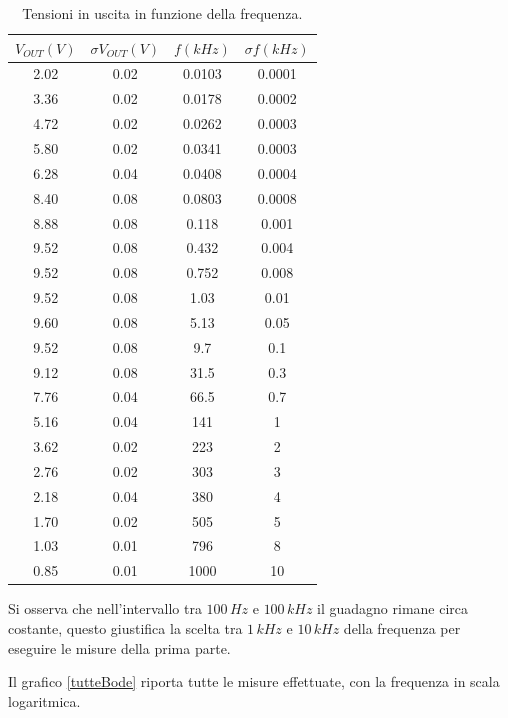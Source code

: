 \documentclass[10pt,a4paper]{article}
\begin{document}
\begin{table}[!htb]\centering
\begin{tabular}{|c|c|c|c|}
\hline
$V_{OUT} (V)$ & $\sigma V_{OUT} (V)$ & $f(kHz)$ & $\sigma f (kHz)$\\
\hline
2.02 & 0.02 & 0.0103 & 0.0001\\
3.36 & 0.02 & 0.0178 & 0.0002\\
4.72 & 0.02 & 0.0262 & 0.0003\\
5.80 & 0.02 & 0.0341 & 0.0003\\
6.28 & 0.04 & 0.0408 & 0.0004\\
8.40 & 0.08 & 0.0803 & 0.0008\\
8.88 & 0.08 & 0.118 & 0.001\\
9.52 & 0.08 & 0.432 & 0.004\\
9.52 & 0.08 & 0.752 & 0.008\\
9.52 & 0.08 & 1.03 & 0.01\\
9.60 & 0.08 & 5.13 & 0.05\\
9.52 & 0.08 & 9.7 & 0.1\\
9.12 & 0.08 & 31.5 & 0.3\\
7.76 & 0.04 & 66.5 & 0.7\\
5.16 & 0.04 & 141 & 1\\
3.62 & 0.02 & 223 & 2\\
2.76 & 0.02 & 303 & 3\\
2.18 & 0.04 & 380 & 4\\
1.70 & 0.02 & 505 & 5\\
1.03 & 0.01 & 796 & 8\\
0.85 & 0.01 & 1000 & 10\\
\hline
\end{tabular}
\caption{Tensioni in uscita in funzione della frequenza.}
\label{bode}
\end{table}

Si osserva che nell'intervallo tra $100\,Hz$ e $100\,kHz$ il guadagno rimane circa costante, questo giustifica la scelta tra $1 \, kHz$ e $10 \, kHz$ della frequenza per eseguire le misure della prima parte.





Il grafico \ref{tutteBode} riporta tutte le misure effettuate, con la frequenza in scala logaritmica.
\end{document}
